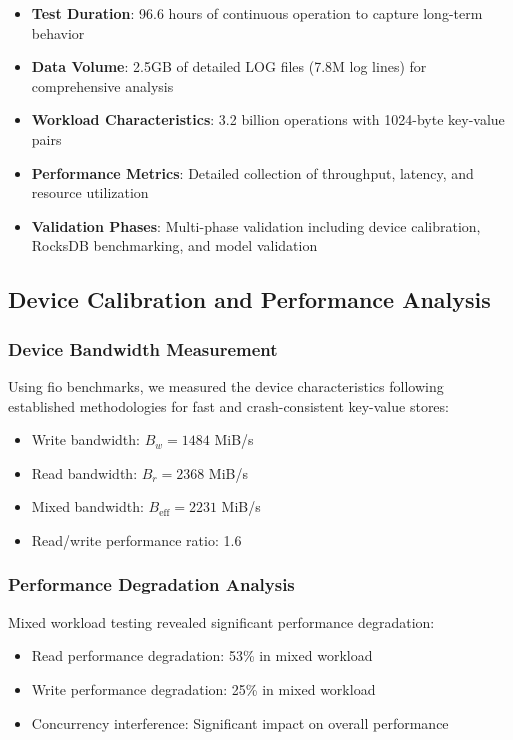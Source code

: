 \documentclass[11pt]{article}
\begin{document}
\begin{itemize}
    \item \textbf{Test Duration}: 96.6 hours of continuous operation to capture long-term behavior
    \item \textbf{Data Volume}: 2.5GB of detailed LOG files (7.8M log lines) for comprehensive analysis
    \item \textbf{Workload Characteristics}: 3.2 billion operations with 1024-byte key-value pairs
    \item \textbf{Performance Metrics}: Detailed collection of throughput, latency, and resource utilization
    \item \textbf{Validation Phases}: Multi-phase validation including device calibration, RocksDB benchmarking, and model validation
\end{itemize}

\subsection{Device Calibration and Performance Analysis}

\subsubsection{Device Bandwidth Measurement}
Using fio benchmarks, we measured the device characteristics following established methodologies for fast and crash-consistent key-value stores:
\begin{itemize}
    \item Write bandwidth: $B_w = 1484$ MiB/s
    \item Read bandwidth: $B_r = 2368$ MiB/s
    \item Mixed bandwidth: $B_{\text{eff}} = 2231$ MiB/s
    \item Read/write performance ratio: 1.6
\end{itemize}

\subsubsection{Performance Degradation Analysis}
Mixed workload testing revealed significant performance degradation:
\begin{itemize}
    \item Read performance degradation: 53\% in mixed workload
    \item Write performance degradation: 25\% in mixed workload
    \item Concurrency interference: Significant impact on overall performance
\end{itemize}
\end{document}
